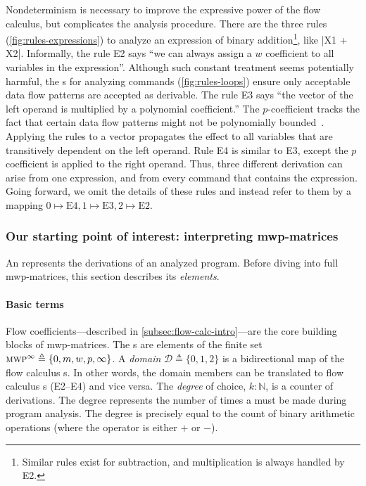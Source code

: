 Nondeterminism is necessary to improve the expressive
power of the flow calculus, but
complicates the analysis procedure. There are the three rules
(\autoref{fig:rules-expressions}) to analyze an expression of binary
addition\footnote{ Similar rules exist for subtraction, and multiplication is
always handled by E2.}, like \pr|X1 + X2|. Informally, the rule E2 says
\enquote{we can always assign a \(w\) coefficient to all variables in
the expression}. Although such constant treatment seems  potentially harmful,
the s for analyzing commands (\autoref{fig:rules-loops})
ensure only acceptable data flow patterns are accepted as
derivable. The rule E3 says \enquote{the vector of the left
operand is multiplied by a polynomial coefficient.} The
\(p\)-coefficient tracks the fact that certain data flow patterns might
not be polynomially bounded~\cite[p. 13]{jones2009}. Applying the rules to a
vector propagates the effect to all variables that are transitively dependent on
the left operand. Rule E4 is similar to E3, except the \(p\)
coefficient is applied to the right operand. Thus, three different derivation
can arise from one expression, and from every command that contains the
expression. Going forward, we omit the details of these rules and instead refer
to them by a mapping \(0 \mapsto \text{E4}, 1 \mapsto \text{E3}, 2 \mapsto
\text{E2}\).

\subsubsection{Our starting point of interest: interpreting mwp-matrices}
\label{subsec:mat-decode}

An  represents the derivations of an analyzed program. Before
diving into full mwp-matrices, this section describes its
\emph{elements}.

\paragraph*{Basic terms}
Flow coefficients---described in \autoref{subsec:flow-calc-intro}---are the core
building blocks of mwp-matrices. The s are elements of the
finite set \(\text{\textsc{mwp}}^\infty \triangleq \{0, m, w,
p,\infty\}\). A
\emph{domain} \(\mathcal{D} \triangleq \{0, 1, 2 \}\)
is a bidirectional map of the flow calculus s. In other words, the domain members can be translated to flow calculus
s (E2--E4) and vice versa. The \emph{degree} of choice, \(k
: \mathbb{N}\), is a counter of derivations. The degree
represents the number of times a  must be made during
program analysis. The degree is precisely equal to the count of binary
arithmetic operations (where the operator is either \(+\) or \(-\)).

